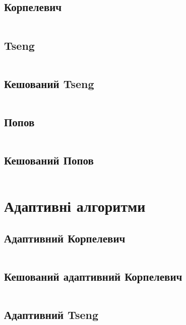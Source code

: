 \subsection{Корпелевич}
\inputminted[linenos,firstline=09,lastline=40,fontsize=\tiny]{python}{src/core/korpelevich.py}

\newpage\subsection{Tseng}
\inputminted[linenos,firstline=09,lastline=41,fontsize=\tiny]{python}{src/core/tseng.py}

\newpage\subsection{Кешований Tseng}
\inputminted[linenos,firstline=44,lastline=77,fontsize=\tiny]{python}{src/core/tseng.py}

\newpage\subsection{Попов}
\inputminted[linenos,firstline=09,lastline=42,fontsize=\tiny]{python}{src/core/popov.py}

\newpage\subsection{Кешований Попов}
\inputminted[linenos,firstline=45,lastline=81,fontsize=\tiny]{python}{src/core/popov.py}

\section{Адаптивні алгоритми}

\subsection{Адаптивний Корпелевич}
\inputminted[linenos,firstline=09,lastline=52,fontsize=\tiny]{python}{src/adaptive/korpelevich.py}

\newpage\subsection{Кешований адаптивний Корпелевич}
\inputminted[linenos,firstline=56,lastline=102,fontsize=\tiny]{python}{src/adaptive/korpelevich.py}

\newpage\subsection{Адаптивний Tseng}
\inputminted[linenos,firstline=09,lastline=52,fontsize=\tiny]{python}{src/adaptive/tseng.py}

